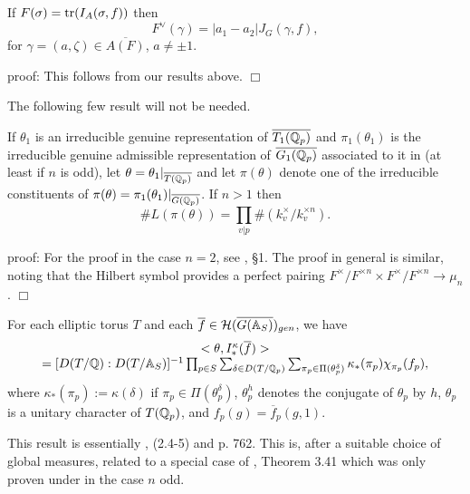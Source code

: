 \begin{lemma}
If $F(\sigma)={\rm tr}(I_A(\sigma,f))$ then
\[
F^\vee(\gamma)
=|a_1-a_2|J_G(\gamma,f),
\]
for $\gamma =(a,\zeta)\in \overline{A(F)}$, $a\not= \pm 1$.
\end{lemma}

proof: This follows from our results above. $\Box$

The following few result will not be needed.

\begin{lemma} If $\theta_1$ is an irreducible genuine representation
of $\overline{T_1({\Bbb Q}_p)}$ and $\pi_1(\theta_1)$ is the
irreducible genuine admissible representation of
$\overline{G_1({\Bbb Q}_p)}$ associated to it in \cite{J}
(at least if $n$ is odd), let
$\theta =\theta_1|_{\overline{T({\Bbb{Q}}_p)}}$ and let
$\pi(\theta)$ denote one of the irreducible
constituents of
$\pi(\theta) =\pi_1(\theta_1)|_{\overline{G({\Bbb{Q}}_p)}}$.
If $n>1$ then
\[
\# L(\pi(\theta))=
\prod_{v|p}\#( k_v^\times/k_v^{\times n}).
\]
\end{lemma}

proof: For the proof in the case $n=2$, see \cite{GPS}, \S 1.
The proof in general is similar, noting that
the Hilbert symbol provides a perfect pairing
$F^\times/F^{\times n}\times F^\times/F^{\times n}
\rightarrow \mu_n$. $\Box$

\begin{lemma}
For each elliptic torus $T$ and each
$\overline{f}\in {\cal{H}}(\overline{G({\Bbb{A}}_S)})_{gen}$,
we have
\[
\begin{array}{c}
<\theta ,I_{*}^\kappa (\overline{f} )> \\
=[D(T/{\Bbb{Q}}):D(T/{\Bbb{A}}_S)]^{-1}
\prod_{p\in S}
\sum_{\delta\in D(T/{\Bbb Q}_p)}
\sum_{\pi _p\in \Pi (\theta_p^\delta)}
\kappa _{*}(\pi _p)\chi _{\pi_p}(f_p),
\end{array}
\]
where $\kappa _{*}(\pi _p):=\kappa (\delta)$ if
$\pi _p\in \Pi(\theta_p^\delta)$,
${\theta }_p^h$ denotes the conjugate of ${\theta }_p$ by $h$,
${\theta }_p$ is a unitary character
of $T({\Bbb{Q}}_p)$, and $f_p(g)=\overline{f}_p(g,1)$.
\end{lemma}

\begin{remark}
This result is essentially \cite{LL}, (2.4-5) and p. 762.
This is, after a suitable
choice of global measures, related to a special case of
\cite{J}, Theorem 3.41 which was only proven under in the case $n$ odd.
\end{remark}

